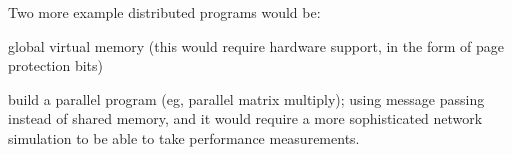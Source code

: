 Two more example distributed programs would be:

  global virtual memory (this would require hardware support,
   in the form of page protection bits)

  build a parallel program (eg, parallel matrix multiply);
   using message passing instead of shared memory, and it
   would require a more sophisticated network simulation
   to be able to take performance measurements.
